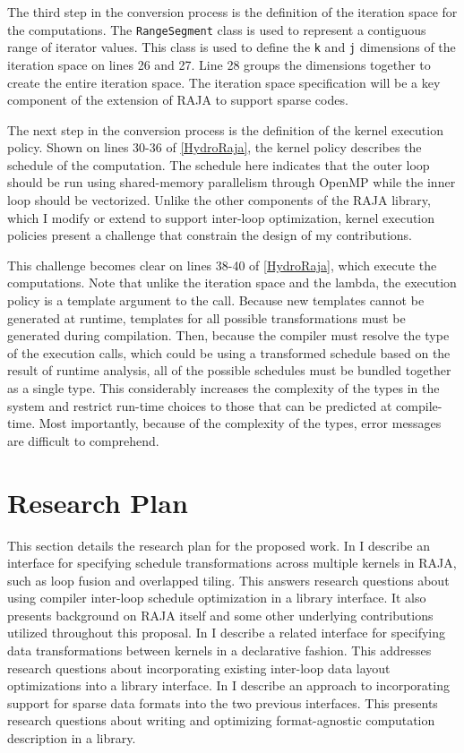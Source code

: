 \documentclass{article}
\begin{document}
The third step in the conversion process is the definition of the iteration space for the computations.
The \verb.RangeSegment. class is used to represent a contiguous range of iterator values.
This class is used to define the \verb.k. and \verb.j. dimensions of the iteration space on lines 26 and 27. 
Line 28 groups the dimensions together to create the entire iteration space.
The iteration space specification will be a key component of the extension of RAJA to support sparse codes.

The next step in the conversion process is the definition of the kernel execution policy. 
Shown on lines 30-36 of \autoref{HydroRaja}, the kernel policy describes the schedule of the computation. 
The schedule here indicates that the outer loop should be run using shared-memory parallelism through OpenMP while the inner loop should be vectorized. 
Unlike the other components of the RAJA library, which I modify or extend to support inter-loop optimization, kernel execution policies present a challenge that constrain the design of my contributions.

This challenge becomes clear on lines 38-40 of \autoref{HydroRaja}, which execute the computations.
Note that unlike the iteration space and the lambda, the execution policy is a template argument to the call.
Because new templates cannot be generated at runtime, templates for all possible transformations must be generated during compilation.
Then, because the compiler must resolve the type of the execution calls, which could be using a transformed schedule based on the result of runtime analysis, all of the possible schedules must be bundled together as a single type.
This considerably increases the complexity of the types in the system and restrict run-time choices to those that can be predicted at compile-time.
Most importantly, because of the complexity of the types, error messages are difficult to comprehend.

\section{Research Plan}
\label{Sec:Plan}
This section details the research plan for the proposed work.
In  I describe an interface for specifying schedule transformations across multiple kernels in RAJA, such as loop fusion and overlapped tiling. 
This answers research questions about using compiler inter-loop  schedule optimization in a library interface.
It also presents background on RAJA itself and some other underlying contributions utilized throughout this proposal.
In  I describe a related interface for specifying data transformations between kernels in a declarative fashion. 
This addresses research questions about incorporating existing inter-loop data layout optimizations into a library interface.
In  I describe an approach to incorporating support for sparse data formats into the two previous interfaces. 
This presents research questions about writing and optimizing format-agnostic computation description in a library.
\end{document}
